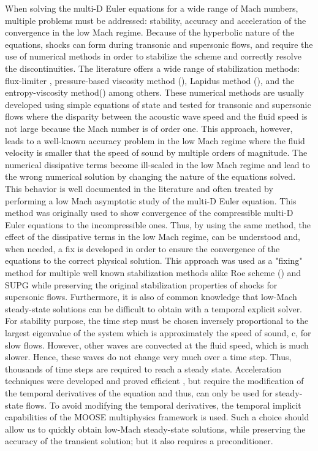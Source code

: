 When solving the multi-D Euler equations for a wide range of Mach numbers, multiple problems must be addressed: stability, accuracy and acceleration of the convergence in the low Mach regime. Because of the hyperbolic nature of the equations, shocks can form during transonic and supersonic flows, and require the use of numerical methods in order to stabilize the scheme and correctly resolve the discontinuities. The literature offers a wide range of stabilization methods: flux-limiter \cite{FluxLimiter1, FluxLimiter2}, pressure-based viscosity method (\cite{PBV_book}), Lapidus method (\cite{Lapidus_paper, LMP, Lapidus_book}), and the entropy-viscosity method(\cite{jlg1, jlg2}) among others. These numerical methods are usually developed using simple equations of state and tested for transonic and supersonic flows where the disparity between the acoustic wave speed and the fluid speed is not large because the Mach number is of order one. This approach, however, leads to a well-known accuracy problem in the low Mach regime where the fluid velocity is smaller that the speed of sound by multiple orders of magnitude. The numerical dissipative terms become ill-scaled in the low Mach regime and lead to the wrong numerical solution by changing the nature of the equations solved. This behavior is well documented in the literature \cite{LowMach1, LowMach2, LowMach3} and often treated by performing a low Mach asymptotic study of the multi-D Euler equation. This method was originally used \cite{LowMach1} to show convergence of the compressible multi-D Euler equations to the incompressible ones. Thus, by using the same method, the effect of the dissipative terms in the low Mach regime, can be understood and, when needed, a fix is developed in order to ensure the convergence of the equations to the correct physical solution. This approach was used as a "fixing" method for multiple well known stabilization methods alike Roe scheme (\cite{Roe}) and SUPG \cite{LowMach3} while preserving the original stabilization properties of shocks for supersonic flows. Furthermore, it is also of common knowledge that low-Mach steady-state solutions can be difficult to obtain with a temporal explicit solver. For stability purpose, the time step must be chosen inversely proportional to the largest eigenvalue of the system which is approximately the speed of sound, c, for slow flows. However, other waves are convected at the fluid speed, which is much slower. Hence, these waves do not change very much over a time step. Thus, thousands of time steps are required to reach a steady state. Acceleration techniques were developed and proved efficient \cite{LowMach2}, but require the modification of the temporal derivatives of the equation and thus, can only be used for steady-state flows. To avoid modifying the temporal derivatives, the temporal implicit capabilities of the MOOSE multiphysics framework \cite{Moose} is used. Such a choice should allow us to quickly obtain low-Mach steady-state solutions, while preserving the accuracy of the transient solution; but it also requires a preconditioner.

